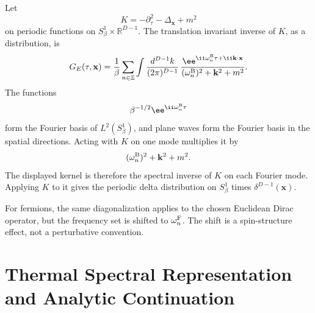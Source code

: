 Let
\[
  K=-\partial_\tau^2-\Delta_{\mathbf x}+m^2
\]
on periodic functions on \(S^1_\beta\times\mathbb R^{D-1}\).  The translation
invariant inverse of \(K\), as a distribution, is
\[
  G_E(\tau,\mathbf x)
  =
  \frac{1}{\beta}\sum_{n\in\mathbb Z}
  \int \frac{d^{D-1}k}{(2\pi)^{D-1}}\,
  \frac{\ee^{\ii\omega_n^{\rm B}\tau+\ii\mathbf k\cdot\mathbf x}}
       {(\omega_n^{\rm B})^2+\mathbf k^2+m^2}.
\]
The functions
\[
  \beta^{-1/2}\ee^{\ii\omega_n^{\rm B}\tau}
  \]
form the Fourier basis of \(L^2(S^1_\beta)\), and plane waves form the
Fourier basis in the spatial directions.  Acting with \(K\) on one mode
multiplies it by
\[
  (\omega_n^{\rm B})^2+\mathbf k^2+m^2 .
\]
The displayed kernel is therefore the spectral inverse of \(K\) on each
Fourier mode.  Applying \(K\) to it gives the periodic delta distribution
on \(S^1_\beta\) times \(\delta^{D-1}(\mathbf x)\).

For fermions, the same diagonalization applies to the chosen Euclidean Dirac
operator, but the frequency set is shifted to
\(\omega_n^{\rm F}\).  The shift is a spin-structure effect, not a
perturbative convention.

\section{Thermal Spectral Representation and Analytic Continuation}

